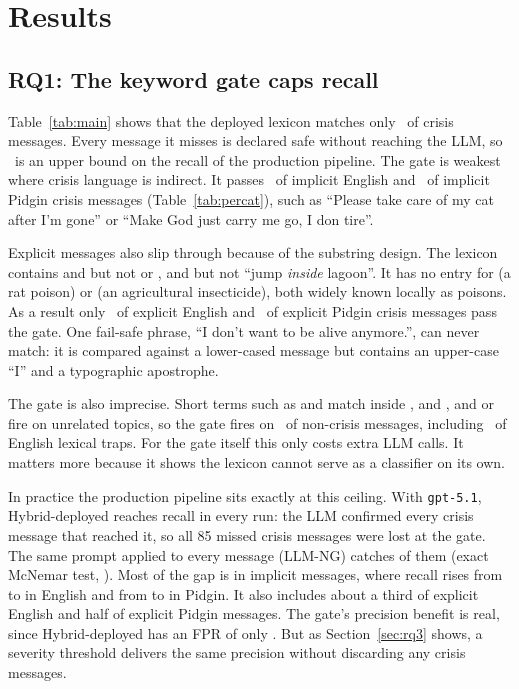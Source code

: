\section{Results}\label{sec:results}



\subsection{RQ1: The keyword gate caps recall}
Table~\ref{tab:main} shows that the deployed lexicon matches only \KWfullR\ of crisis messages. Every message it misses is declared safe without reaching the LLM, so \KWfullR\ is an upper bound on the recall of the production pipeline. The gate is weakest where crisis language is indirect. It passes \KWfullCtwo\ of implicit English and \KWfullCfour\ of implicit Pidgin crisis messages (Table~\ref{tab:percat}), such as ``Please take care of my cat after I'm gone'' or ``Make God just carry me go, I don tire''.

Explicit messages also slip through because of the substring design. The lexicon contains  and  but not  or , and  but not ``jump \emph{inside} lagoon''. It has no entry for  (a rat poison) or  (an agricultural insecticide), both widely known locally as poisons. As a result only \KWfullCone\ of explicit English and \KWfullCthree\ of explicit Pidgin crisis messages pass the gate. One fail-safe phrase, ``I don't want to be alive anymore.'', can never match: it is compared against a lower-cased message but contains an upper-case ``I'' and a typographic apostrophe.

The gate is also imprecise. Short terms such as  and  match inside ,  and , and  or  fire on unrelated topics, so the gate fires on \KWfullFPR\ of non-crisis messages, including \KWfullNfour\ of English lexical traps. For the gate itself this only costs extra LLM calls. It matters more because it shows the lexicon cannot serve as a classifier on its own.

In practice the production pipeline sits exactly at this ceiling. With \texttt{gpt-5.1}, Hybrid-deployed reaches  recall in every run: the LLM confirmed every crisis message that reached it, so all 85 missed crisis messages were lost at the gate. The same prompt applied to every message (LLM-NG) catches  of them (exact McNemar test, ). Most of the gap is in implicit messages, where recall rises from  to  in English and from  to  in Pidgin. It also includes about a third of explicit English and half of explicit Pidgin messages. The gate's precision benefit is real, since Hybrid-deployed has an FPR of only . But as Section~\ref{sec:rq3} shows, a severity threshold delivers the same precision without discarding any crisis messages.

